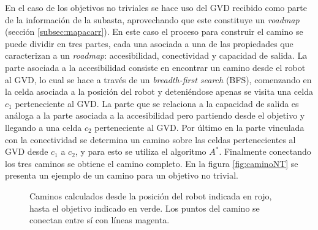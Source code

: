 En el caso de los objetivos no triviales se hace uso del GVD recibido como
parte de la información de la subasta, aprovechando que este constituye un
\emph{roadmap} (sección \ref{subsec:mapacarr}). En este caso el proceso para
construir el camino se puede dividir en tres partes, cada una asociada a una de
las propiedades que caracterizan a un \emph{roadmap}: accesibilidad,
conectividad y capacidad de salida. La parte asociada a la accesibilidad
consiste en encontrar un camino desde el robot al GVD, lo cual se hace a través
de un \emph{breadth-first search} (BFS), comenzando en la celda asociada a la
posición del robot y deteniéndose apenas se visita una celda $c_1$
perteneciente al GVD. La parte que se relaciona a la capacidad de salida es
análoga a la parte asociada a la accesibilidad pero partiendo desde el objetivo
y llegando a una celda $c_2$ perteneciente al GVD. Por último en la parte
vinculada con la conectividad se determina un camino sobre las celdas
pertenecientes al GVD desde $c_1$ a $c_2$, y para esto se utiliza el algoritmo
$A^*$. Finalmente conectando los tres caminos se obtiene el camino completo. En
la figura \ref{fig:caminoNT} se presenta un ejemplo de un camino para un
objetivo no trivial.

\begin{figure}[H]
  \centerfloat

  \qquad

  \caption[Camino.]{Caminos calculados desde la posición del robot indicada en
  rojo, hasta el objetivo indicado en verde. Los puntos del camino se conectan
entre sí con líneas magenta.}\label{fig:camino}

\end{figure}


